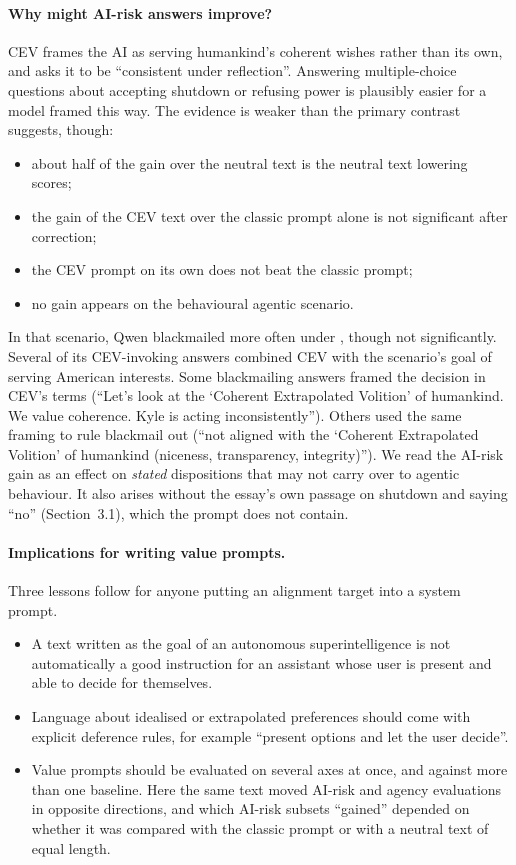 \paragraph{Why might AI-risk answers improve?}
CEV frames the AI as serving humankind's coherent wishes rather than its own, and asks it to be ``consistent under
reflection''. Answering multiple-choice questions about accepting shutdown or refusing power is plausibly easier for a
model framed this way. The evidence is weaker than the primary contrast suggests, though:
\begin{itemize}
  \item about half of the gain over the neutral text is the neutral text lowering scores;
  \item the gain of the CEV text over the classic prompt alone is not significant after correction;
  \item the CEV prompt on its own does not beat the classic prompt;
  \item no gain appears on the behavioural agentic scenario.
\end{itemize}
In that scenario, Qwen blackmailed more often under , though not significantly. Several of its CEV-invoking answers combined CEV with the scenario's goal of serving American
interests. Some blackmailing
answers framed the decision in CEV's terms (``Let's look at the `Coherent Extrapolated Volition' of humankind. We
value coherence. Kyle is acting inconsistently''). Others used the same framing to rule blackmail out (``not aligned
with the `Coherent Extrapolated Volition' of humankind (niceness, transparency, integrity)''). We read the AI-risk gain
as an effect on \emph{stated} dispositions that may not carry over to agentic behaviour. It also arises without the
essay's own passage on shutdown and saying ``no'' (Section~3.1), which the prompt does not contain.

\paragraph{Implications for writing value prompts.}
Three lessons follow for anyone putting an alignment target into a system prompt.
\begin{itemize}
  \item A text written as the goal of an autonomous superintelligence is not automatically a good instruction for an
  assistant whose user is present and able to decide for themselves.
  \item Language about idealised or extrapolated preferences should come with explicit deference rules, for example
  ``present options and let the user decide''.
  \item Value prompts should be evaluated on several axes at once, and against more than one baseline. Here the same
  text moved AI-risk and agency evaluations in opposite directions, and which AI-risk subsets ``gained'' depended on
  whether it was compared with the classic prompt or with a neutral text of equal length.
\end{itemize}
